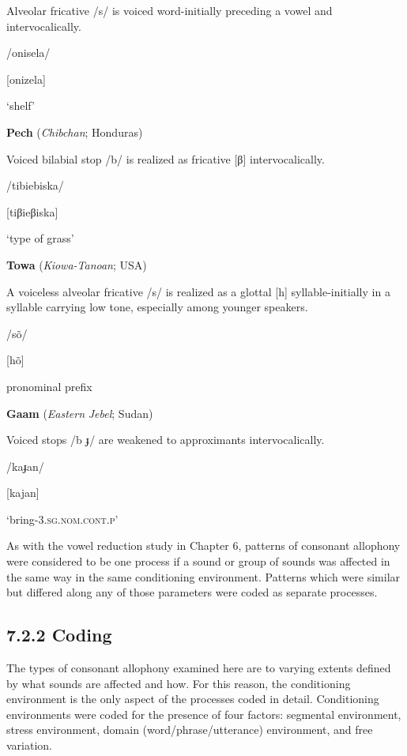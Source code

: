 Alveolar fricative /s/ is voiced word-initially preceding a vowel and intervocalically.

/onisela/

[onizela]

‘shelf’

\citep[30-1]{Bonvillain1973}

\z

\ea\label{ex:(7.15)}
  \textbf{Pech} (\textit{Chibchan}; Honduras)

Voiced bilabial stop /b/ is realized as fricative [β] intervocalically.

/tibiebiska/

[tiβieβiska]

‘type of grass’

\citep[16]{Holt1999}

\z

\ea\label{ex:(7.16)}
  \textbf{Towa} (\textit{Kiowa-Tanoan}; USA)

A voiceless alveolar fricative /s/ is realized as a glottal [h] syllable-initially in a syllable carrying low tone, especially among younger speakers.

/sõ/

[hõ]

pronominal prefix

\citep[13]{Yumitani1998}
\z

\ea\label{ex:(7.17)}
  \textbf{Gaam} (\textit{Eastern} \textit{Jebel}; Sudan)

Voiced stops /b ɟ/ are weakened to approximants intervocalically.

/kaɟan/

[kajan]

‘bring-3.\textsc{sg.nom.cont.p}’

\citep[24-5]{Stirtz2011}
\z

  As with the vowel reduction study in Chapter 6, patterns of consonant allophony were considered to be one process if a sound or group of sounds was affected in the same way in the same conditioning environment. Patterns which were similar but differed along any of those parameters were coded as separate processes.

\subsection{7.2.2 Coding}

  The types of consonant allophony examined here are to varying extents defined by what sounds are affected and how. For this reason, the conditioning environment is the only aspect of the processes coded in detail. Conditioning environments were coded for the presence of four factors: segmental environment, stress environment, domain (word/phrase/utterance) environment, and free variation.

